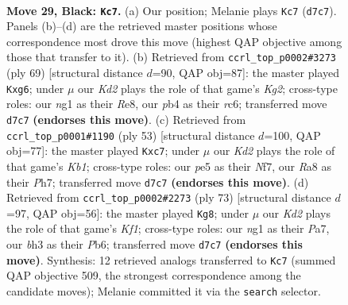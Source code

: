 \documentclass[11pt]{article}
\begin{document}
\clearpage

\begin{figure}[p]\centering
\begin{subfigure}{0.46\textwidth}\centering
\resizebox{\linewidth}{!}{%
\newchessgame
\chessboard[
  setfen={r7/pp1k4/np2Q1p1/1P1pP3/1P1P4/2N4B/8/4K1N1 b - - 0 29},
  showmover=false,
  pgfstyle=straightmove, color=movearrow, markmove={d7-c7}
]}
\caption{}
\end{subfigure}\hfill
\begin{subfigure}{0.46\textwidth}\centering
\resizebox{\linewidth}{!}{%
\newchessgame
\chessboard[
  setfen={4r3/5pk1/1pR1p1Q1/pPnpP3/5B2/5PP1/1P6/6K1 b - - 0 35},
  showmover=false,
  pgfstyle=straightmove, color=movearrow, markmove={g7-g6}
]}
\caption{}
\end{subfigure}
\\[4pt]
\begin{subfigure}{0.46\textwidth}\centering
\resizebox{\linewidth}{!}{%
\newchessgame
\chessboard[
  setfen={1k5r/1pQ2n1p/1n6/pp2P3/P2N4/bP4P1/6B1/1K1R4 b - - 0 27},
  showmover=false,
  pgfstyle=straightmove, color=movearrow, markmove={b8-c7}
]}
\caption{}
\end{subfigure}\hfill
\begin{subfigure}{0.46\textwidth}\centering
\resizebox{\linewidth}{!}{%
\newchessgame
\chessboard[
  setfen={5k2/p4p1p/1p2p2Q/8/2P2p2/6P1/PN1q1P1P/6K1 b - - 2 37},
  showmover=false,
  pgfstyle=straightmove, color=movearrow, markmove={f8-g8}
]}
\caption{}
\end{subfigure}
\caption{\textbf{Move 29, Black: \texttt{Kc7}.} (a) Our position; Melanie plays \texttt{Kc7} (\texttt{d7c7}). Panels (b)--(d) are the retrieved master positions whose correspondence most drove this move (highest QAP objective among those that transfer to it). (b) Retrieved from \texttt{ccrl\_top\_p0002\#3273} (ply 69) [structural distance $d$=90, QAP obj=87]: the master played \texttt{Kxg6}; under $\mu$ our \emph{Kd2} plays the role of that game's \emph{Kg2}; cross-type roles: our \emph{n}g1 as their \emph{R}e8, our \emph{p}b4 as their \emph{r}c6; transferred move \texttt{d7c7} \textbf{(endorses this move)}. (c) Retrieved from \texttt{ccrl\_top\_p0001\#1190} (ply 53) [structural distance $d$=100, QAP obj=77]: the master played \texttt{Kxc7}; under $\mu$ our \emph{Kd2} plays the role of that game's \emph{Kb1}; cross-type roles: our \emph{p}e5 as their \emph{N}f7, our \emph{R}a8 as their \emph{P}h7; transferred move \texttt{d7c7} \textbf{(endorses this move)}. (d) Retrieved from \texttt{ccrl\_top\_p0002\#2273} (ply 73) [structural distance $d$=97, QAP obj=56]: the master played \texttt{Kg8}; under $\mu$ our \emph{Kd2} plays the role of that game's \emph{Kf1}; cross-type roles: our \emph{n}g1 as their \emph{P}a7, our \emph{b}h3 as their \emph{P}b6; transferred move \texttt{d7c7} \textbf{(endorses this move)}. Synthesis: 12 retrieved analogs transferred to \texttt{Kc7} (summed QAP objective 509, the strongest correspondence among the candidate moves); Melanie committed it via the \texttt{search} selector.}
\label{fig:thought-m57}
\end{figure}
\end{document}
